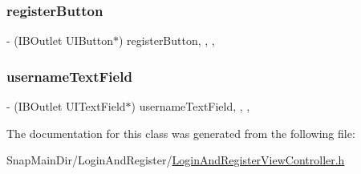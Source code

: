 \subsubsection{\texorpdfstring{register\+Button}{registerButton}}
{\footnotesize\ttfamily -\/ (I\+B\+Outlet U\+I\+Button$\ast$) register\+Button\hspace{0.3cm}{\ttfamily [read]}, {\ttfamily [write]}, {\ttfamily [nonatomic]}, {\ttfamily [weak]}}

\hypertarget{interface_login_and_register_view_controller_aeb58d304082f61d7f0e475ad48965071}{}\label{interface_login_and_register_view_controller_aeb58d304082f61d7f0e475ad48965071} 
\subsubsection{\texorpdfstring{username\+Text\+Field}{usernameTextField}}
{\footnotesize\ttfamily -\/ (I\+B\+Outlet U\+I\+Text\+Field$\ast$) username\+Text\+Field\hspace{0.3cm}{\ttfamily [read]}, {\ttfamily [write]}, {\ttfamily [nonatomic]}, {\ttfamily [weak]}}



The documentation for this class was generated from the following file\+:\begin{DoxyCompactItemize}
\item 
Snap\+Main\+Dir/\+Login\+And\+Register/\hyperlink{_login_and_register_view_controller_8h}{Login\+And\+Register\+View\+Controller.\+h}\end{DoxyCompactItemize}
